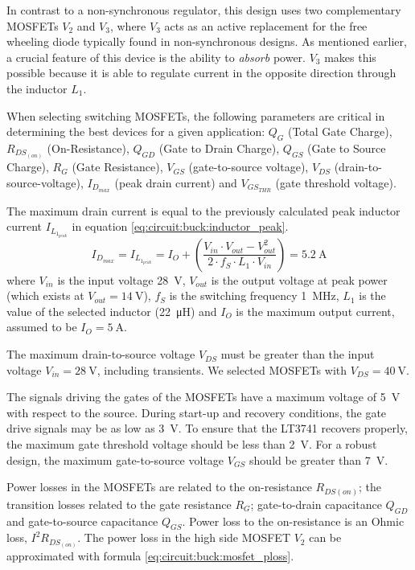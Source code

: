 In contrast to a non-synchronous regulator, this design uses  two  complementary
MOSFETs $V_2$ and $V_3$, where $V_3$ acts as an active replacement for the  free
wheeling diode typically found in non-synchronous designs. As mentioned earlier,
a crucial feature of  this  device  is the ability to \emph{absorb} power. $V_3$
makes  this  possible  because  it  is  able to regulate current in the opposite
direction through the inductor $L_1$.

When  selecting  switching  MOSFETs,  the  following  parameters are critical in
determining the best devices for a given application: $Q_G$ (Total Gate Charge),
$R_{DS_{(on)}}$ (On-Resistance), $Q_{GD}$ (Gate to Drain Charge), $Q_{GS}$ (Gate
to Source  Charge),  $R_G$ (Gate Resistance), $V_{GS}$ (gate-to-source voltage),
$V_{DS}$  (drain-to-source-voltage),  $I_{D_{max}}$  (peak  drain  current)  and
$V_{GS_{THR}}$ (gate threshold voltage).

The maximum drain current is equal to the previously  calculated  peak  inductor
current $I_{L_{1_{peak}}}$ in equation \ref{eq:circuit:buck:inductor_peak}.
\begin{equation}
    I_{D_{max}} = I_{L_{1_{peak}}} = I_O + \left(\frac{V_{in}\cdot V_{out} - V_{out}^2}{2\cdot f_S \cdot L_1 \cdot V_{in}}\right) = \SI{5.2}{\ampere}
    \label{eq:circuit:buck:mosfet_id}
\end{equation}
where $V_{in}$ is the  input  voltage  \SI{28}{\volt},  $V_{out}$  is the output
voltage at peak power (which exists at $V_{out} = \SI{14}{\volt}$), $f_S$ is the
switching  frequency  \SI{1}{\mega\hertz},  $L_1$  is the value of the  selected
inductor (\SI{22}{\micro\henry})  and  $I_O$  is  the  maximum  output  current,
assumed to be $I_O = \SI{5}{\ampere}$.

The  maximum drain-to-source voltage $V_{DS}$ must be  greater  than  the  input
voltage $V_{in} = \SI{28}{\volt}$,  including  transients.  We  selected MOSFETs
with $V_{DS} = \SI{40}{\volt}$.

The  signals  driving  the  gates  of  the MOSFETs have  a  maximum  voltage  of
\SI{5}{\volt}  with   respect  to  the  source.  During  start-up  and  recovery
conditions, the gate drive signals  may  be  as  low as \SI{3}{\volt}. To ensure
that the LT3741 recovers properly, the  maximum gate threshold voltage should be
less than \SI{2}{\volt}. For a robust design, the maximum gate-to-source voltage
$V_{GS}$ should be greater than \SI{7}{\volt}.

Power losses in the MOSFETs are related to the on-resistance $R_{DS{(on)}}$; the
transition  losses  related  to  the  gate   resistance   $R_G$;   gate-to-drain
capacitance  $Q_{GD}$ and gate-to-source capacitance $Q_{GS}$. Power loss to the
on-resistance is an  Ohmic loss, $I^2 R_{DS_{(on)}}$. The power loss in the high
side     MOSFET     $V_2$      can      be     approximated     with     formula
\ref{eq:circuit:buck:mosfet_ploss}.

